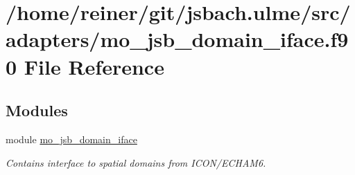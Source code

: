 \hypertarget{mo__jsb__domain__iface_8f90}{}\section{/home/reiner/git/jsbach.ulme/src/adapters/mo\+\_\+jsb\+\_\+domain\+\_\+iface.f90 File Reference}
\label{mo__jsb__domain__iface_8f90}
\subsection*{Modules}
\begin{DoxyCompactItemize}
\item 
module \hyperlink{namespacemo__jsb__domain__iface}{mo\+\_\+jsb\+\_\+domain\+\_\+iface}
\begin{DoxyCompactList}\small\item\em Contains interface to spatial domains from I\+C\+O\+N/\+E\+C\+H\+A\+M6. \end{DoxyCompactList}\end{DoxyCompactItemize}
